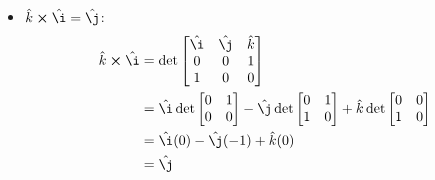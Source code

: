\documentclass{report}
\newenvironment{answer}
{\begin{minipage}{\linewidth}}
{\end{minipage}}
\begin{document}
\begin{answer}
\begin{itemize}
\item $\hat{k} \cross \hat{\i} = \hat{\j}$:
\begin{align*}
\hat{k} \cross \hat{\i} &= \det
\begin{bmatrix}
\hat{\i} & \hat{\j} & \hat{k} \\
0 & 0 & 1 \\
1 & 0 & 0
\end{bmatrix} \\
&= \hat{\i} \det \begin{bmatrix} 0 & 1 \\ 0 & 0 \end{bmatrix}
 - \hat{\j} \det \begin{bmatrix} 0 & 1 \\ 1 & 0 \end{bmatrix}
 + \hat{ k} \det \begin{bmatrix} 0 & 0 \\ 1 & 0 \end{bmatrix} \\
&= \hat{\i} (0) - \hat{\j} (-1) + \hat{k} (0) \\
&= \hat{\j}
\end{align*}
\end{itemize}
\end{answer}
\end{document}
